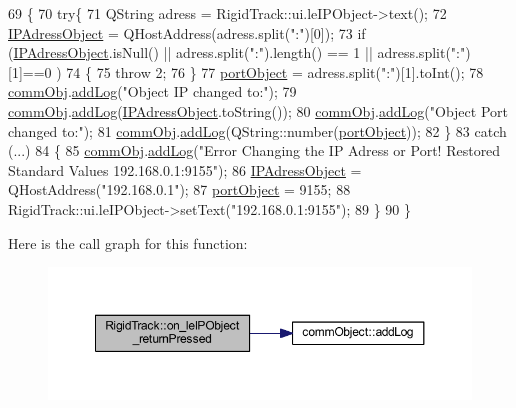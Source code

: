 \begin{DoxyCode}
69 \{
70     \textcolor{keywordflow}{try}\{
71     QString adress = RigidTrack::ui.leIPObject->text();
72     \hyperlink{main_8cpp_ab97ac0d82b1753d0eef37089be17e5e1}{IPAdressObject} = QHostAddress(adress.split(\textcolor{stringliteral}{":"})[0]);
73     \textcolor{keywordflow}{if} (\hyperlink{main_8cpp_ab97ac0d82b1753d0eef37089be17e5e1}{IPAdressObject}.isNull() || adress.split(\textcolor{stringliteral}{":"}).length() == 1 || adress.split(\textcolor{stringliteral}{":"})[1]==0
      )
74     \{
75         \textcolor{keywordflow}{throw} 2;
76     \}
77     \hyperlink{main_8cpp_a9a00043c93a3362969c1c1fcd3a70fea}{portObject} = adress.split(\textcolor{stringliteral}{":"})[1].toInt();
78     \hyperlink{main_8cpp_af29e7fc07ae0979d5fb61b473241d33d}{commObj}.\hyperlink{classcomm_object_aec354c7099b3039083cc4224e071e022}{addLog}(\textcolor{stringliteral}{"Object IP changed to:"});
79     \hyperlink{main_8cpp_af29e7fc07ae0979d5fb61b473241d33d}{commObj}.\hyperlink{classcomm_object_aec354c7099b3039083cc4224e071e022}{addLog}(\hyperlink{main_8cpp_ab97ac0d82b1753d0eef37089be17e5e1}{IPAdressObject}.toString());
80     \hyperlink{main_8cpp_af29e7fc07ae0979d5fb61b473241d33d}{commObj}.\hyperlink{classcomm_object_aec354c7099b3039083cc4224e071e022}{addLog}(\textcolor{stringliteral}{"Object Port changed to:"});
81     \hyperlink{main_8cpp_af29e7fc07ae0979d5fb61b473241d33d}{commObj}.\hyperlink{classcomm_object_aec354c7099b3039083cc4224e071e022}{addLog}(QString::number(\hyperlink{main_8cpp_a9a00043c93a3362969c1c1fcd3a70fea}{portObject}));
82     \}
83     \textcolor{keywordflow}{catch} (...)
84     \{
85         \hyperlink{main_8cpp_af29e7fc07ae0979d5fb61b473241d33d}{commObj}.\hyperlink{classcomm_object_aec354c7099b3039083cc4224e071e022}{addLog}(\textcolor{stringliteral}{"Error Changing the IP Adress or Port! Restored Standard Values
       192.168.0.1:9155"});
86         \hyperlink{main_8cpp_ab97ac0d82b1753d0eef37089be17e5e1}{IPAdressObject} = QHostAddress(\textcolor{stringliteral}{"192.168.0.1"});
87         \hyperlink{main_8cpp_a9a00043c93a3362969c1c1fcd3a70fea}{portObject} = 9155;
88         RigidTrack::ui.leIPObject->setText(\textcolor{stringliteral}{"192.168.0.1:9155"});
89     \}
90 \}
\end{DoxyCode}
Here is the call graph for this function\+:
\nopagebreak
\begin{figure}[H]
\begin{center}
\leavevmode
\includegraphics[width=350pt]{class_rigid_track_a9f037a061b2577815fc80e5e9f8d46d9_cgraph}
\end{center}
\end{figure}
